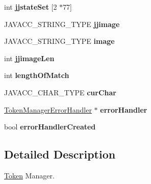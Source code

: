 \begin{DoxyCompactItemize}
int {\bfseries jjstate\+Set} \mbox{[}2 $\ast$77\mbox{]}
\item 
\mbox{\label{classvhdl_1_1parser_1_1_vhdl_parser_token_manager_af3536eaedbccc65fdfc9a48980bceba5}} 
J\+A\+V\+A\+C\+C\+\_\+\+S\+T\+R\+I\+N\+G\+\_\+\+T\+Y\+PE {\bfseries jjimage}
\item 
\mbox{\label{classvhdl_1_1parser_1_1_vhdl_parser_token_manager_a6e5106f2a45c32ec7920da5262fcbfa6}} 
J\+A\+V\+A\+C\+C\+\_\+\+S\+T\+R\+I\+N\+G\+\_\+\+T\+Y\+PE {\bfseries image}
\item 
\mbox{\label{classvhdl_1_1parser_1_1_vhdl_parser_token_manager_ac294054608204dd471e772c2e421f093}} 
int {\bfseries jjimage\+Len}
\item 
\mbox{\label{classvhdl_1_1parser_1_1_vhdl_parser_token_manager_a6d05b89884c43044653109f5cb9d7621}} 
int {\bfseries length\+Of\+Match}
\item 
\mbox{\label{classvhdl_1_1parser_1_1_vhdl_parser_token_manager_a2e30a3883a50802a60317c8b330cb216}} 
J\+A\+V\+A\+C\+C\+\_\+\+C\+H\+A\+R\+\_\+\+T\+Y\+PE {\bfseries cur\+Char}
\item 
\mbox{\label{classvhdl_1_1parser_1_1_vhdl_parser_token_manager_a1da257ee8c87820a0517053ed2ccb36e}} 
\mbox{\hyperlink{classvhdl_1_1parser_1_1_token_manager_error_handler}{Token\+Manager\+Error\+Handler}} $\ast$ {\bfseries error\+Handler}
\item 
\mbox{\label{classvhdl_1_1parser_1_1_vhdl_parser_token_manager_a51ed3ca28aad0cdc02eb3886aaef63d8}} 
bool {\bfseries error\+Handler\+Created}
\end{DoxyCompactItemize}


\subsection{Detailed Description}
\mbox{\hyperlink{classvhdl_1_1parser_1_1_token}{Token}} Manager. 


